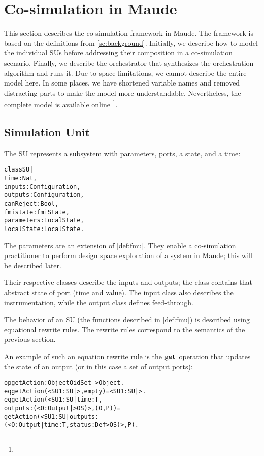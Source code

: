 \section{Co-simulation in Maude}
This section describes the co-simulation framework in Maude.
The framework is based on the definitions from \cref{sc:background}. 
Initially, we describe how to model the individual SUs before addressing their composition in a co-simulation scenario. 
Finally, we describe the orchestrator that synthesizes the orchestration algorithm and runs it.
Due to space limitations, we cannot describe the entire model here. 
In some places, we have shortened variable names and removed distracting parts to make the model more understandable.
Nevertheless, the complete model is available online \footnote{}.

\subsection{Simulation Unit}
The SU represents a subsystem with parameters, ports, a state, and a time:

\begin{alltt}
  \small
  class SU |
    time : Nat, 
    inputs : Configuration, 
    outputs : Configuration,
    canReject : Bool, 
    fmistate : fmiState,
    parameters : LocalState,
    localState : LocalState .
  \end{alltt}

The parameters are an extension of \cref{def:fmu}.
They enable a co-simulation practitioner to perform design space exploration of a system in Maude; this will be described later.

Their respective classes describe the inputs and outputs; the class contains that abstract state of port (time and value).
The input class also describes the instrumentation, while the output class defines feed-through.

The behavior of an SU (the functions described in \cref{def:fmu}) is described using equational rewrite rules.
The rewrite rules correspond to the semantics of the previous section.

An example of such an equation rewrite rule is the $\mathtt{get}_{}$ operation that updates the state of an output (or in this case a set of output ports):

\begin{alltt}
  \small
  op getAction : Object OidSet -> Object .
  eq getAction(< SU1 : SU | >, empty) = < SU1 : SU | > .
  eq getAction(< SU1 : SU | time : T, 
    outputs : (< O : Output | > OS) >, (O , P)) = 
    getAction(< SU1 : SU | outputs : 
    (< O : Output | time : T, status : Def > OS) >, P) .
\end{alltt}

